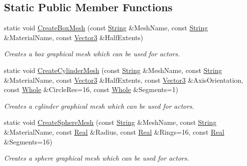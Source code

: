 \subsection*{Static Public Member Functions}
\begin{DoxyCompactItemize}
\item 
static void \hyperlink{classphys_1_1MeshGenerator_a1710315174186367ce566125feb3df6d}{CreateBoxMesh} (const \hyperlink{namespacephys_aa03900411993de7fbfec4789bc1d392e}{String} \&MeshName, const \hyperlink{namespacephys_aa03900411993de7fbfec4789bc1d392e}{String} \&MaterialName, const \hyperlink{classphys_1_1Vector3}{Vector3} \&HalfExtents)
\begin{DoxyCompactList}\small\item\em Creates a box graphical mesh which can be used for actors. \item\end{DoxyCompactList}\item 
static void \hyperlink{classphys_1_1MeshGenerator_a7d7372e91e3d039c656f78be3cb5b951}{CreateCylinderMesh} (const \hyperlink{namespacephys_aa03900411993de7fbfec4789bc1d392e}{String} \&MeshName, const \hyperlink{namespacephys_aa03900411993de7fbfec4789bc1d392e}{String} \&MaterialName, const \hyperlink{classphys_1_1Vector3}{Vector3} \&HalfExtents, const \hyperlink{classphys_1_1Vector3}{Vector3} \&AxisOrientation, const \hyperlink{namespacephys_a460f6bc24c8dd347b05e0366ae34f34a}{Whole} \&CircleRes=16, const \hyperlink{namespacephys_a460f6bc24c8dd347b05e0366ae34f34a}{Whole} \&Segments=1)
\begin{DoxyCompactList}\small\item\em Creates a cylinder graphical mesh which can be used for actors. \item\end{DoxyCompactList}\item 
static void \hyperlink{classphys_1_1MeshGenerator_a2d1dfdfe8fae04773de67118a4513f5d}{CreateSphereMesh} (const \hyperlink{namespacephys_aa03900411993de7fbfec4789bc1d392e}{String} \&MeshName, const \hyperlink{namespacephys_aa03900411993de7fbfec4789bc1d392e}{String} \&MaterialName, const \hyperlink{namespacephys_af7eb897198d265b8e868f45240230d5f}{Real} \&Radius, const \hyperlink{namespacephys_af7eb897198d265b8e868f45240230d5f}{Real} \&Rings=16, const \hyperlink{namespacephys_af7eb897198d265b8e868f45240230d5f}{Real} \&Segments=16)
\begin{DoxyCompactList}\small\item\em Creates a sphere graphical mesh which can be used for actors. \item\end{DoxyCompactList}\end{DoxyCompactItemize}


